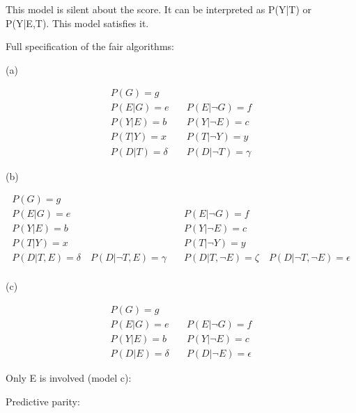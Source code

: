 \documentclass{article}
\begin{document}
This model is silent about the score. It can be interpreted as P(Y|T) or P(Y|E,T). This model satisfies it. 


Full specification of the fair algorithms:

(a)

\begin{align*}
  P(G) = g & \quad \\
  P(E|G) = e & \quad P(E|\neg G) = f \\
  P(Y|E) = b & \quad P(Y|\neg E) = c \\
  P(T|Y) = x & \quad P(T|\neg Y) = y \\
  P(D|T) = \delta & \quad P(D|\neg T) = \gamma
\end{align*}

(b)

\begin{align*}
  P(G) = g & \quad \\
  P(E|G) = e & \quad P(E|\neg G) = f \\
  P(Y|E) = b & \quad P(Y|\neg E) = c \\
  P(T|Y) = x & \quad P(T|\neg Y) = y \\
  P(D|T, E) = \delta \quad P(D|\neg T, E) = \gamma & \quad P(D|T, \neg E) = \zeta \quad P(D|\neg T, \neg E) = \epsilon \\
\end{align*}

(c)

\begin{align*}
  P(G) = g & \quad \\
  P(E|G) = e & \quad P(E|\neg G) = f \\
  P(Y|E) = b &  \quad P(Y|\neg E) = c \\
  P(D|E) = \delta &  \quad P(D|\neg  E) = \epsilon
\end{align*}






Only E is involved (model c):

Predictive parity:
\end{document}
